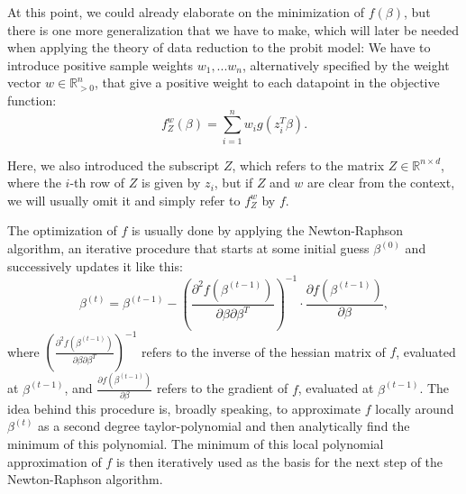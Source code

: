 At this point, we could already elaborate on the
minimization of $f(\beta)$, but there is one more
generalization that we have to make, which will
later be needed when applying the theory of data
reduction to the probit model: We have to
introduce positive sample weights $w_1, ... w_n$,
alternatively specified by the weight vector
$w \in \mathbb{R}_{>0}^n$, that give a positive
weight to each datapoint in the objective function:
\begin{equation}
    \label{eq:weighted-objective-function}
    f_Z^w(\beta) = \sum_{i=1}^n w_i g(z_i^T \beta).
\end{equation}

\noindent Here, we also introduced the subscript $Z$,
which refers to the matrix $Z \in \mathbb{R}^{n \times d}$,
where the $i$-th row of $Z$ is given by $z_i$,
but if $Z$ and $w$ are clear from the
context, we will usually omit it and simply refer to
$f_Z^w$ by $f$.

The optimization of $f$ is usually done by applying the
Newton-Raphson algorithm, an iterative procedure that
starts at some initial guess $\beta^{(0)}$ and successively
updates it like this:
\begin{equation}
    \beta^{(t)} = \beta^{(t-1)} - \left(\frac{\partial^2f(\beta^{(t-1)})}{\partial\beta\partial\beta^T}\right)^{-1}
    \cdot \frac{\partial f(\beta^{(t-1)})}{\partial\beta},
\end{equation}
where $\left(\frac{\partial^2f(\beta^{(t-1)})}{\partial\beta\partial\beta^T}\right)^{-1}$
refers to the inverse of the hessian matrix of $f$, evaluated at
$\beta^{(t-1)}$, and $\frac{\partial f(\beta^{(t-1)})}{\partial\beta}$
refers to the gradient of $f$, evaluated at $\beta^{(t-1)}$.
The idea behind this procedure is, broadly speaking, to approximate
$f$ locally around $\beta^{(t)}$ as a second degree taylor-polynomial and then
analytically find the minimum of this polynomial. The minimum of this
local polynomial approximation of $f$ is then
iteratively used as the basis for the next step of the
Newton-Raphson algorithm.

